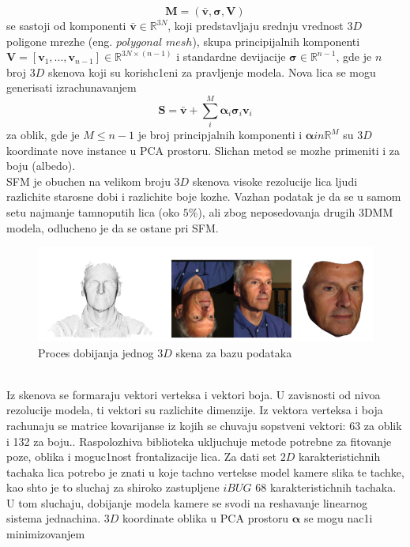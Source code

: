 \documentclass[a4paper, openany, oneside, 11pt]{book}
\begin{document}
\begin{equation}
\mathbf{M} = (\bar{\mathbf{v}}, \mathbf{\sigma}, \mathbf{V})
\end{equation}
se sastoji od komponenti $\bar{\mathbf{v}}\in\mathbb{R}^{3N}$, koji predstavljaju srednju vrednost $3D$ poligone mrezhe (eng. $polygonal$ $mesh$), skupa principijalnih komponenti $\mathbf{V}=[\mathbf{v}_1,...,\mathbf{v}_{n-1}]\in\mathbb{R}^{3N\times(n-1)}$ i standardne devijacije $\mathbf{\sigma}\in\mathbb{R}^{n-1}$, gde je $n$ broj $3D$ skenova koji su korish\-c1eni za pravljenje modela. Nova lica se mogu generisati izrachunavanjem
\begin{equation}
\mathbf{S} = \bar{\mathbf{v}}+\sum^M_i\mathbf{\alpha}_i\mathbf{\sigma}_i\mathbf{v}_i
\end{equation}
za oblik, gde je $M\le n-1$ je broj principjalnih komponenti i $\mathbf{\alpha}in\mathbb{R}^{M}$ su $3D$ koordinate nove instance u \acrshort{PCA} prostoru. Slichan metod se mozhe primeniti i za boju (albedo).\\
\acrshort{SFM} je obuchen na velikom broju $3D$ skenova visoke rezolucije lica ljudi razlichite starosne dobi i razlichite boje kozhe. Vazhan podatak je da se u samom setu najmanje tamnoputih lica (oko $5\%$), ali zbog neposedovanja drugih \acrshort{3DMM} modela, odlucheno je da se ostane pri \acrshort{SFM}. 
\begin{figure}[h!]
\centering
  \includegraphics[scale=0.7]{res/Scan3DMM.png}
  \caption{Proces dobijanja jednog $3D$ skena za bazu podataka}
  \label{fig:2_6}
  \vspace{0pt}
\end{figure}\\
Iz skenova se formaraju vektori verteksa i vektori boja. U zavisnosti od nivoa rezolucije modela, ti vektori su razlichite dimenzije. Iz vektora verteksa i boja rachunaju se matrice kovarijanse iz kojih se chuvaju sopstveni vektori: 63 za oblik i 132 za boju.. Raspolozhiva biblioteka ukljuchuje metode potrebne za fitovanje poze, oblika i moguc1nost frontalizacije lica. Za dati set $2D$ karakteristichnih tachaka lica potrebo je znati u koje tachno vertekse model kamere slika te tachke, kao shto je to sluchaj za shiroko zastupljene $iBUG$ 68 karakteristichnih tachaka. U tom sluchaju, dobijanje modela kamere se svodi na reshavanje linearnog sistema jednachina. $3D$ koordinate oblika u \acrshort{PCA} prostoru $\mathbf{\alpha}$ se mogu nac1i minimizovanjem
\end{document}
